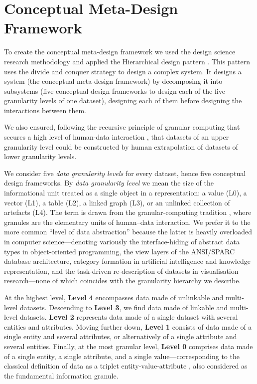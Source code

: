 \documentclass[12pt,a4paper]{article}
\begin{document}
\section{Conceptual Meta-Design Framework}
\label{sec:framework}

To create the conceptual meta-design framework we used the design science research methodology \citep{hevner2004} and applied the Hierarchical design pattern \citep{vaishnavi2015}. This pattern uses the divide and conquer strategy to design a complex system. It designs a system (the conceptual meta-design framework) by decomposing it into subsystems (five conceptual design frameworks to design each of the five granularity levels of one dataset), designing each of them before designing the interactions between them.

\vspace{1em}

\noindent We also ensured, following the recursive principle of granular computing that secures a high level of human-data interaction \citep{wilke2016}, that datasets of an upper granularity level could be constructed by human extrapolation of datasets of lower granularity levels.

\vspace{1em}

\noindent We consider five \emph{data granularity levels} for every dataset, hence five conceptual design frameworks. By \emph{data granularity level} we mean the size of the informational unit treated as a single object in a representation: a value (L0), a vector (L1), a table (L2), a linked graph (L3), or an unlinked collection of artefacts (L4). The term is drawn from the granular-computing tradition \citep{wilke2016}, where granules are the elementary units of human--data interaction. We prefer it to the more common ``level of data abstraction'' because the latter is heavily overloaded in computer science---denoting variously the interface-hiding of abstract data types in object-oriented programming, the view layers of the ANSI/SPARC database architecture, category formation in artificial intelligence and knowledge representation, and the task-driven re-description of datasets in visualisation research---none of which coincides with the granularity hierarchy we describe.

\vspace{1em}

\noindent At the highest level, \textbf{Level 4} encompasses data made of unlinkable and multi-level datasets. Descending to \textbf{Level 3}, we find data made of linkable and multi-level datasets. \textbf{Level 2} represents data made of a single dataset with several entities and attributes. Moving further down, \textbf{Level 1} consists of data made of a single entity and several attributes, or alternatively of a single attribute and several entities. Finally, at the most granular level, \textbf{Level 0} comprises data made of a single entity, a single attribute, and a single value---corresponding to the classical definition of data as a triplet entity-value-attribute \citep{redman1997}, also considered as the fundamental information granule.
\end{document}
